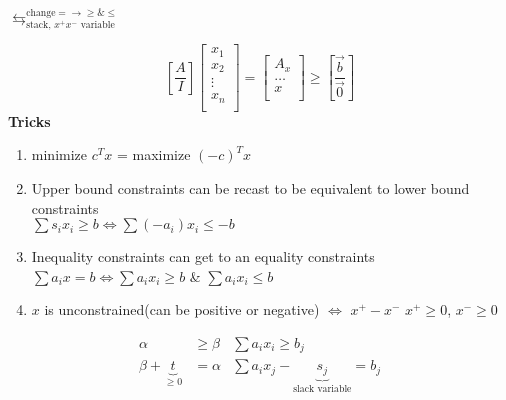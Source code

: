 \documentclass[12pt]{article}
\begin{document}
$\leftrightarrows^{\text{change}= \to \geq \& \leq}_\text{stack, $x^+x^-$ variable}$

$$\left[\frac{A}{I}\right]\begin{bmatrix}
x_1\\
x_2\\
\vdots\\
x_n\\
\end{bmatrix}=\begin{bmatrix}
A_x\\
\dots\\
x\\
\end{bmatrix}
\geq 
\left[\frac{\vec{b}}{\vec{0}}\right]$$ 
\textbf{Tricks}
\begin{enumerate}
	\item minimize $c^Tx$ = maximize $(-c)^Tx$
	\item Upper bound constraints can be recast to be equivalent to lower bound constraints\\ $\sum s_ix_i \geq b \iff \sum(-a_i)x_i\leq-b$
	\item Inequality constraints can get to an equality constraints\\ $\sum a_ix=b\iff \sum a_ix_i \geq b$ \& $\sum a_i x_i \leq b$
	\item $x$ is unconstrained(can be positive or negative) $\iff$ $x^+-x^-$ $x^+\geq0$, $x^- \geq 0$
\end{enumerate}
	\begin{align*}
	\alpha &\geq \beta &\sum a_ix_i \geq b_j\\
	\beta + \underbrace{t}_{\geq 0} &= \alpha
	&\sum a_ix_j-\underbrace{s_j}_\text{slack variable}=b_j
	\end{align*}
\end{document}
